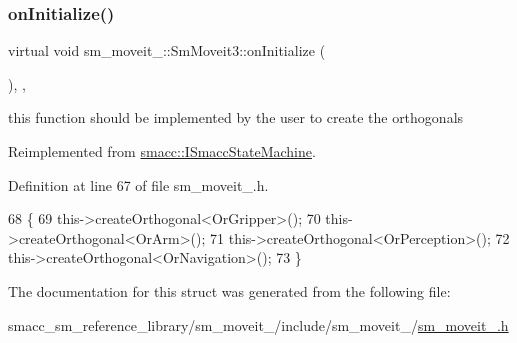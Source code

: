 \subsubsection{\texorpdfstring{on\+Initialize()}{onInitialize()}}
{\footnotesize\ttfamily virtual void sm\+\_\+moveit\+\_\+::\+Sm\+Moveit3\+::on\+Initialize (\begin{DoxyParamCaption}{ }\end{DoxyParamCaption})\hspace{0.3cm}{\ttfamily [inline]}, {\ttfamily [override]}, {\ttfamily [virtual]}}



this function should be implemented by the user to create the orthogonals 



Reimplemented from \hyperlink{classsmacc_1_1ISmaccStateMachine_ac2982c6c8283663e5e1e8a7c82f511ec}{smacc\+::\+I\+Smacc\+State\+Machine}.



Definition at line 67 of file sm\+\_\+moveit\+\_.\+h.


\begin{DoxyCode}
68     \{
69         this->createOrthogonal<OrGripper>();
70         this->createOrthogonal<OrArm>();
71         this->createOrthogonal<OrPerception>();
72         this->createOrthogonal<OrNavigation>();
73     \}
\end{DoxyCode}


The documentation for this struct was generated from the following file\+:\begin{DoxyCompactItemize}
\item 
smacc\+\_\+sm\+\_\+reference\+\_\+library/sm\+\_\+moveit\+\_/include/sm\+\_\+moveit\+\_/\hyperlink{sm__moveit__3_8h}{sm\+\_\+moveit\+\_.\+h}\end{DoxyCompactItemize}
